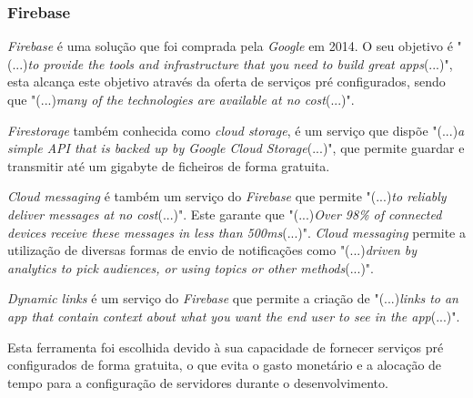 \subsubsection{Firebase}
\emph{Firebase} é uma solução que foi comprada pela \textit{Google} em 2014. O seu objetivo é "(...)\emph{to provide the tools and infrastructure that you need to build great apps}(...)"\citep{Moroney2017}, esta alcança este objetivo através da oferta de serviços pré configurados, sendo que "(...)\emph{many of the technologies are available at no cost}(...)"\citep{Moroney2017}.

\textit{Firestorage} também conhecida como \textit{cloud storage}, é um serviço que dispõe "(...)\emph{a simple	API that is backed up by Google Cloud Storage}(...)"\citep{Moroney2017}, que permite guardar e transmitir até um gigabyte de ficheiros de forma gratuita.

\textit{Cloud messaging} é também um serviço do \textit{Firebase} que permite "(...)\emph{to reliably deliver messages at no cost}(...)"\citep{Moroney2017}. Este garante que "(...)\emph{Over 98\% of connected devices receive these messages in less than 500ms}(...)"\citep{Moroney2017}. \textit{Cloud messaging} permite a utilização de diversas formas de envio de notificações como "(...)\emph{driven by analytics to pick audiences, or using topics or other methods}(...)"\citep{Moroney2017}.

\textit{Dynamic links} é um serviço do \textit{Firebase} que permite a criação de "(...)\emph{links to an app that contain context about what you want the end user to see in the app}(...)"\citep{Moroney2017}.

Esta ferramenta foi escolhida devido à sua capacidade de fornecer serviços pré configurados de forma gratuita, o que evita o gasto monetário e a alocação de tempo para a configuração de servidores durante o desenvolvimento.